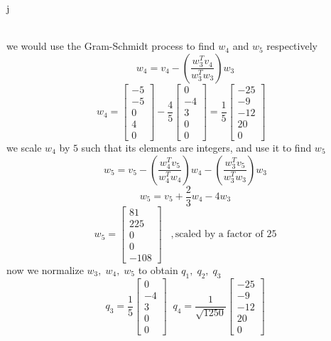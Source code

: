 j\documentclass[12pt]{article}
\begin{document}
\begin{enumerate}
\begin{enumerate}
        \\
        we would use the Gram-Schmidt process to find $w_4$ and $w_5$ respectively
        \[
        w_4=v_4- \left( \frac{w_3^Tv_4}{w_3^Tw_3} \right)w_3
        \]
        \[
        w_4=
        \begin{bmatrix}
            -5\\ -5\\ 0\\4\\0
        \end{bmatrix}
        -
        \frac{4}{5}
        \begin{bmatrix}
            0\\-4\\3\\0\\0
        \end{bmatrix}
        =
        \frac{1}{5}
        \begin{bmatrix}
           -25\\-9\\-12\\20 \\0
        \end{bmatrix}
        \;\;\;
        \]
        we scale $w_4$ by $5$ such that its elements are integers, and use it to find $w_5$
        \[
        w_5 = v_5- \left( \frac{w_4^Tv_5}{w_4^Tw_4}\right)w_4 - \left( \frac{w_3^Tv_5}{w_3^Tw_3}\right)w_3
        \]
        \[
        w_5= v_5
        +\frac{2}{3}w_4
        -4w_3
        \]
        \[
        w_5=
        \begin{bmatrix}
        81\\225\\0\\0\\-108   
        \end{bmatrix}\;\;\;, \text{scaled by a factor of 25}
        \]
        now we normalize $w_3,\;w_4,\;w_5$ to obtain $q_1,\;q_2,\;q_3$
        \[
        q_3=
        \frac{1}{5}
        \begin{bmatrix}
            0\\ -4\\ 3 \\0 \\0
        \end{bmatrix}\;\;
        q_4=\frac{1}{\sqrt{1250}}
        \begin{bmatrix}
           -25\\-9\\-12\\20 \\0

\end{bmatrix}\]
\end{enumerate}
\end{enumerate}
\end{document}

